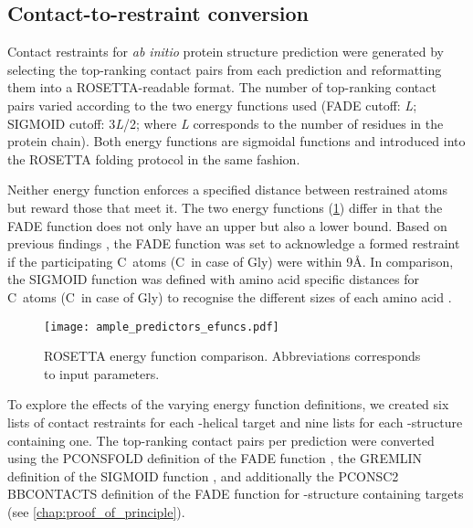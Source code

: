 \subsection{Contact-to-restraint conversion}
Contact restraints for \textit{ab initio} protein structure prediction were generated by selecting the top-ranking contact pairs from each prediction and reformatting them into a ROSETTA-readable format. The number of top-ranking contact pairs varied according to the two energy functions used (FADE cutoff: \textit{L}; SIGMOID cutoff: 3\textit{L}/2; where \textit{L} corresponds to the number of residues in the protein chain). Both energy functions are sigmoidal functions and introduced into the ROSETTA folding protocol in the same fashion. 

Neither energy function enforces a specified distance between restrained atoms but reward those that meet it. The two energy functions (\cref{fig:ample_predictors_efuncs}) differ in that the FADE function does not only have an upper but also a lower bound. Based on previous findings \cite{Michel2014-eg, Skwark2014-qp}, the FADE function was set to acknowledge a formed restraint if the participating C\textbeta\ atoms (C\textalpha\ in case of Gly) were within 9\AA. In comparison, the SIGMOID function was defined with amino acid specific distances for C\textbeta\ atoms (C\textalpha\ in case of Gly) to recognise the different sizes of each amino acid \cite{Kamisetty2013-le, Ovchinnikov2015-tn}.

\begin{figure}[H]
    \centering
    \texttt{[image: ample\_predictors\_efuncs.pdf]}
    \caption[Schematic comparison of ROSETTA energy functions]{ROSETTA energy function comparison. Abbreviations corresponds to input parameters.}
    \label{fig:ample_predictors_efuncs}
\end{figure}

To explore the effects of the varying energy function definitions, we created six lists of contact restraints for each \textalpha-helical target and nine lists for each \textbeta-structure containing one. The top-ranking contact pairs per prediction were converted using the PCONSFOLD definition of the FADE function \cite{Michel2014-eg}, the GREMLIN definition of the SIGMOID function \cite{Ovchinnikov2015-tn}, and additionally the PCONSC2 BBCONTACTS definition of the FADE function for \textbeta-structure containing targets (see \cref{chap:proof_of_principle}).

